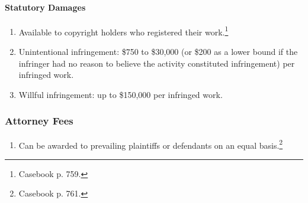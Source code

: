 \paragraph{Statutory Damages}

\begin{enumerate}
    \item Available to copyright holders who registered their 
    work.\footnote{Casebook p. 759.}
    \item Unintentional infringement: \$750 to \$30,000 (or \$200 as a lower 
    bound if the infringer had no reason to believe the activity constituted 
    infringement) per infringed work.
    \item Willful infringement: up to \$150,000 per infringed work.
\end{enumerate}

\subsubsection{Attorney Fees}

\begin{enumerate}
    \item Can be awarded to prevailing plaintiffs or defendants on an equal 
    basis.\footnote{Casebook p. 761.}
\end{enumerate}
